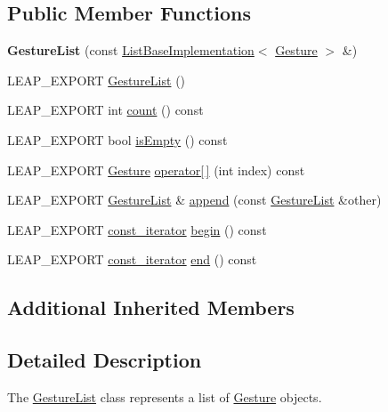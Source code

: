\subsection*{Public Member Functions}
\begin{DoxyCompactItemize}
\item 
\mbox{\label{class_leap_1_1_gesture_list_ac514c84e0d23171471f803354b933044}} 
{\bfseries Gesture\+List} (const \hyperlink{class_leap_1_1_list_base_implementation}{List\+Base\+Implementation}$<$ \hyperlink{class_leap_1_1_gesture}{Gesture} $>$ \&)
\item 
L\+E\+A\+P\+\_\+\+E\+X\+P\+O\+RT \hyperlink{class_leap_1_1_gesture_list_aad564fe5be92fb93119da56f08963142}{Gesture\+List} ()
\item 
L\+E\+A\+P\+\_\+\+E\+X\+P\+O\+RT int \hyperlink{class_leap_1_1_gesture_list_af8d4ba7be0100e36809c0817d72aa380}{count} () const
\item 
L\+E\+A\+P\+\_\+\+E\+X\+P\+O\+RT bool \hyperlink{class_leap_1_1_gesture_list_ab6a03b6ee99ab5aba3b3fc1cdd01ec3a}{is\+Empty} () const
\item 
L\+E\+A\+P\+\_\+\+E\+X\+P\+O\+RT \hyperlink{class_leap_1_1_gesture}{Gesture} \hyperlink{class_leap_1_1_gesture_list_a7d3fe5d35b5e49f9f2e5949c0bb504f1}{operator\mbox{[}$\,$\mbox{]}} (int index) const
\item 
L\+E\+A\+P\+\_\+\+E\+X\+P\+O\+RT \hyperlink{class_leap_1_1_gesture_list}{Gesture\+List} \& \hyperlink{class_leap_1_1_gesture_list_a377880f99549807dc965087ca14e34f1}{append} (const \hyperlink{class_leap_1_1_gesture_list}{Gesture\+List} \&other)
\item 
L\+E\+A\+P\+\_\+\+E\+X\+P\+O\+RT \hyperlink{class_leap_1_1_gesture_list_aaf2fd030e686892a0da42d81fc0cad88}{const\+\_\+iterator} \hyperlink{class_leap_1_1_gesture_list_a32a392c5f85fc781181307d89d42ac03}{begin} () const
\item 
L\+E\+A\+P\+\_\+\+E\+X\+P\+O\+RT \hyperlink{class_leap_1_1_gesture_list_aaf2fd030e686892a0da42d81fc0cad88}{const\+\_\+iterator} \hyperlink{class_leap_1_1_gesture_list_adbf76512046899a413dfea4b3a63b836}{end} () const
\end{DoxyCompactItemize}
\subsection*{Additional Inherited Members}


\subsection{Detailed Description}
The \hyperlink{class_leap_1_1_gesture_list}{Gesture\+List} class represents a list of \hyperlink{class_leap_1_1_gesture}{Gesture} objects.

